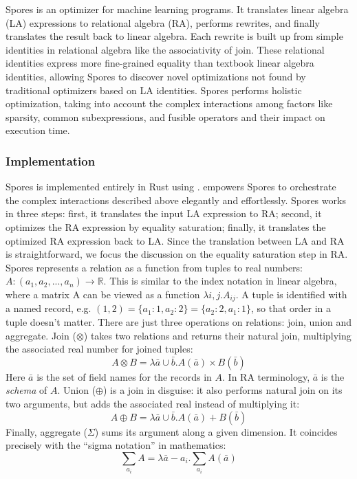 Spores \cite{spores} is an optimizer for machine learning programs. It
translates linear algebra (LA) expressions to relational algebra (RA), performs
rewrites, and finally translates the result back to linear algebra. Each rewrite
is built up from simple identities in relational algebra like the associativity
of join. These relational identities express more fine-grained equality than
textbook linear algebra identities, allowing Spores to discover novel
optimizations not found by traditional optimizers based on LA identities. Spores
performs holistic optimization, taking into account the complex interactions
among factors like sparsity, common subexpressions, and fusible operators and
their impact on execution time.


\subsubsection{Implementation}

Spores is implemented entirely in Rust using \Egg.
\Egg empowers Spores to orchestrate
  the complex interactions described above elegantly and effortlessly.
Spores works in three steps: first, it translates the input LA expression to RA;
second, it optimizes the RA expression by equality saturation; finally, it
translates the optimized RA expression back to LA.
Since the translation between LA and RA is
straightforward, we focus the discussion on the equality saturation step in RA.
Spores represents a relation as a function from tuples to real numbers: $A:
(a_1, a_2, ..., a_n) \rightarrow \mathbb{R}$. This is similar to the index
notation in linear algebra, where a matrix A can be viewed as a function
$\lambda i, j . A_{ij}$. A tuple is identified with a named record,
e.g. $(1, 2) = \{a_1: 1, a_2: 2\} = \{a_2: 2, a_1: 1\}$, so that order in a
tuple doesn't matter. There are just three operations on relations: join, union
and aggregate. Join ($\otimes$) takes two relations and returns their natural
join, multiplying the associated real number for joined tuples:
\[ A \otimes B = \lambda \bar{a} \cup \bar{b} . A(\bar{a}) \times B(\bar{b})\]
Here $\bar{a}$ is the set of field names for the records in $A$. In RA
terminology, $\bar{a}$ is the {\em schema} of $A$. Union ($\oplus$) is a join in
disguise: it also performs natural join on its two arguments, but adds the
associated real instead of multiplying it:
\[A \oplus B = \lambda \bar{a} \cup \bar{b} . A(\bar{a}) + B(\bar{b})\] Finally,
aggregate ($\Sigma$) sums its argument along a given dimension. It
coincides precisely with the ``sigma notation'' in mathematics:
\[\sum_{a_i} A = \lambda \bar{a}-a_i . \sum_{a_i} A(\bar{a})\]


